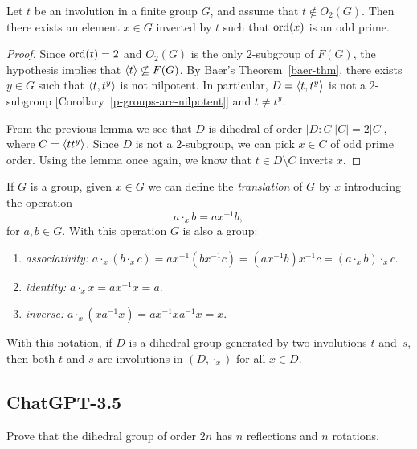 \begin{thm}\label{dihedral-odd-cycle}
    Let\/ $t$ be an involution in a finite group\/ $G$, and assume that\/ $t\notin O_2(G)$. Then there exists an element\/ $x\in G$ inverted by\/ $t$ such that ${\rm ord}(x)$ is an odd prime.
\end{thm}

\begin{proof} Since ${\rm ord}(t)=2$ and $O_2(G)$ is the only $2$-subgroup of $F(G)$, the hypothesis implies that $\langle t\rangle\not\subseteq F(G)$. By Baer's Theorem~\ref{baer-thm}, there exists $y\in G$ such that $\langle t,t^y\rangle$ is not nilpotent. In particular, $D=\langle t,t^y\rangle$ is not a $2$-subgroup [Corollary~\ref{p-groups-are-nilpotent}] and $t\ne t^y$.

From the previous lemma we see that $D$ is dihedral of order $|D:C||C|=2|C|$, where $C=\langle tt^y\rangle$. Since $D$ is not a $2$-subgroup, we can pick $x\in C$ of odd prime order. Using the lemma once again, we know that $t\in D\setminus C$ inverts $x$.  \end{proof}

\begin{rem}\label{rem:translated-group}
    If\/ $G$ is a group, given\/ $x\in G$ we can define the \textsl{translation} of\/ $G$ by\/ $x$ introducing the operation
    $$
        a\cdot_x b= ax^{-1}b,
    $$
    for\/ $a,b\in G$. With this operation\/ $G$ is also a group:
    \begin{enumerate}[-]
        \item \textit{associativity:} $a\cdot_x(b\cdot_x c)=ax^{-1}(bx^{-1}c)=(ax^{-1}b)x^{-1}c=(a\cdot_x b)\cdot_x c$.
        \item \textit{identity:} $a\cdot_x x= ax^{-1}x=a$.
        \item \textit{inverse:} $a\cdot_x(xa^{-1}x) = ax^{-1}xa^{-1}x=x$.
    \end{enumerate}
    With this notation, if\/ $D$ is a dihedral group generated by two involutions $t$ and~$s$, then both\/ $t$ and\/ $s$ are involutions in\/ $(D,\cdot_x)$ for all $x\in D$.
\end{rem}

\subsection{ChatGPT-3.5}

\begin{probl}
    Prove that the dihedral group of order $2n$ has $n$ reflections and $n$ rotations.
\end{probl}

